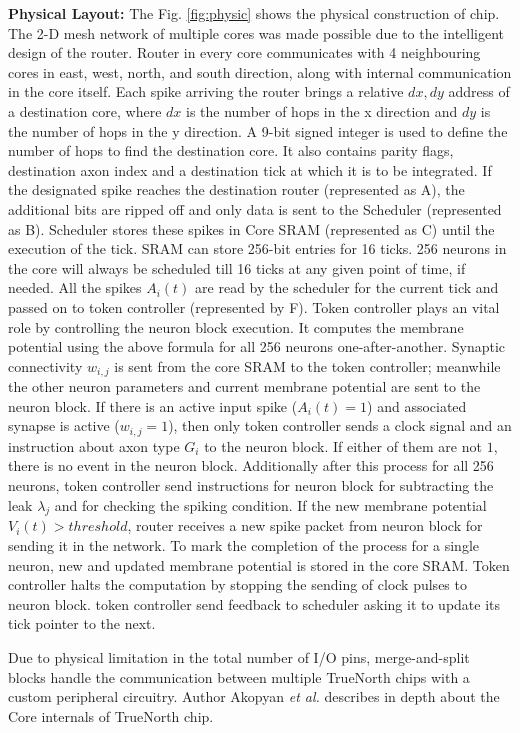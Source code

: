 \documentclass[11pt,twoside]{article}
\begin{document}
\textbf{Physical Layout:} The Fig. \ref{fig:physic} shows the physical construction of chip. The 2-D mesh network of multiple cores was made possible due to the intelligent design of the router. Router in every core communicates with 4 neighbouring cores in east, west, north, and south direction, along with internal communication in the core itself. Each spike arriving the router brings a relative $dx, dy$ address of a destination core, where $dx$ is the number of hops in the x direction and $dy$ is the number of hops in the y direction. A 9-bit signed integer is used to define the number of hops to find the destination core. It also contains parity flags, destination axon index and a destination tick at which it is to be integrated. If the designated spike reaches the destination router (represented as A), the additional bits are ripped off and only data is sent to the Scheduler (represented as B). Scheduler stores these spikes in Core SRAM (represented as C) until the execution of the tick. SRAM can store 256-bit entries for 16 ticks. 256 neurons in the core will always be scheduled till 16 ticks at any given point of time, if needed. All the spikes $A_i(t)$ are read by the scheduler for the current tick and passed on to token controller (represented by F). Token controller plays an vital role by controlling the neuron block execution. It computes the membrane potential using the above formula for all 256 neurons one-after-another. Synaptic connectivity $w_{i,j}$ is sent from the core SRAM to the token controller; meanwhile the other neuron parameters and current membrane potential are sent to the neuron block. If there is an active input spike ($A_i(t) = 1$) and associated synapse is active ($w_{i,j} = 1$), then only token controller sends a clock signal and an instruction about axon type $G_i$ to the neuron block. If either of them are not $1$, there is no event in the neuron block. Additionally after this process for all 256 neurons, token controller send instructions for neuron block for subtracting the leak $\lambda_j$ and for checking the spiking condition. If the new membrane potential $V_i(t) > threshold$, router receives a new spike packet from neuron block for sending it in the network. To mark the completion of the process for a single neuron, new and updated membrane potential is stored in the core SRAM. Token controller halts the computation by stopping the sending of clock pulses to neuron block. token controller send feedback to scheduler asking it to update its tick pointer to the next.

Due to physical limitation in the total number of I/O pins, merge-and-split blocks handle the communication between multiple TrueNorth chips with a custom peripheral circuitry. Author Akopyan \textit{et al.} \cite{akopyan2015truenorth} describes in depth about the Core internals of TrueNorth chip. 
\end{document}
